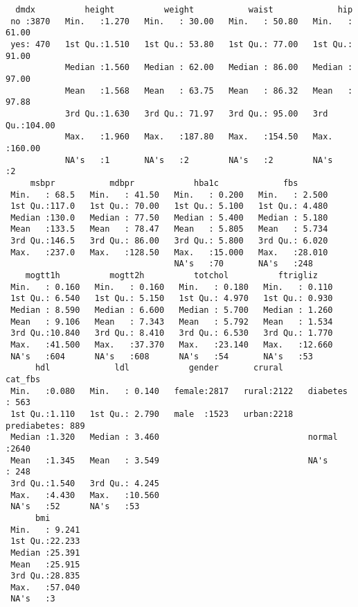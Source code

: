\documentclass[
  letterpaper,
  DIV=11,
  numbers=noendperiod]{scrartcl}
\begin{document}
\begin{verbatim}
  dmdx          height          weight           waist             hip        
 no :3870   Min.   :1.270   Min.   : 30.00   Min.   : 50.80   Min.   : 61.00  
 yes: 470   1st Qu.:1.510   1st Qu.: 53.80   1st Qu.: 77.00   1st Qu.: 91.00  
            Median :1.560   Median : 62.00   Median : 86.00   Median : 97.00  
            Mean   :1.568   Mean   : 63.75   Mean   : 86.32   Mean   : 97.88  
            3rd Qu.:1.630   3rd Qu.: 71.97   3rd Qu.: 95.00   3rd Qu.:104.00  
            Max.   :1.960   Max.   :187.80   Max.   :154.50   Max.   :160.00  
            NA's   :1       NA's   :2        NA's   :2        NA's   :2       
     msbpr           mdbpr            hba1c             fbs        
 Min.   : 68.5   Min.   : 41.50   Min.   : 0.200   Min.   : 2.500  
 1st Qu.:117.0   1st Qu.: 70.00   1st Qu.: 5.100   1st Qu.: 4.480  
 Median :130.0   Median : 77.50   Median : 5.400   Median : 5.180  
 Mean   :133.5   Mean   : 78.47   Mean   : 5.805   Mean   : 5.734  
 3rd Qu.:146.5   3rd Qu.: 86.00   3rd Qu.: 5.800   3rd Qu.: 6.020  
 Max.   :237.0   Max.   :128.50   Max.   :15.000   Max.   :28.010  
                                  NA's   :70       NA's   :248     
    mogtt1h          mogtt2h          totchol          ftrigliz     
 Min.   : 0.160   Min.   : 0.160   Min.   : 0.180   Min.   : 0.110  
 1st Qu.: 6.540   1st Qu.: 5.150   1st Qu.: 4.970   1st Qu.: 0.930  
 Median : 8.590   Median : 6.600   Median : 5.700   Median : 1.260  
 Mean   : 9.106   Mean   : 7.343   Mean   : 5.792   Mean   : 1.534  
 3rd Qu.:10.840   3rd Qu.: 8.410   3rd Qu.: 6.530   3rd Qu.: 1.770  
 Max.   :41.500   Max.   :37.370   Max.   :23.140   Max.   :12.660  
 NA's   :604      NA's   :608      NA's   :54       NA's   :53      
      hdl             ldl            gender       crural            cat_fbs    
 Min.   :0.080   Min.   : 0.140   female:2817   rural:2122   diabetes   : 563  
 1st Qu.:1.110   1st Qu.: 2.790   male  :1523   urban:2218   prediabetes: 889  
 Median :1.320   Median : 3.460                              normal     :2640  
 Mean   :1.345   Mean   : 3.549                              NA's       : 248  
 3rd Qu.:1.540   3rd Qu.: 4.245                                                
 Max.   :4.430   Max.   :10.560                                                
 NA's   :52      NA's   :53                                                    
      bmi        
 Min.   : 9.241  
 1st Qu.:22.233  
 Median :25.391  
 Mean   :25.915  
 3rd Qu.:28.835  
 Max.   :57.040  
 NA's   :3       
\end{verbatim}
\end{document}

